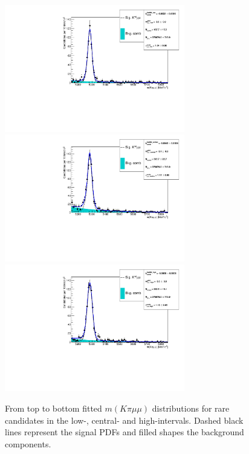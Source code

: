 %
\begin{figure}[h!]
\centering
\includegraphics[width=0.7\textwidth]{RKst/figs/Fit/fit_MM/KstMM_low.pdf}
\includegraphics[width=0.7\textwidth]{RKst/figs/Fit/fit_MM/KstMM_central.pdf}
\includegraphics[width=0.7\textwidth]{RKst/figs/Fit/fit_MM/KstMM_high.pdf}
\caption{From top to bottom fitted 
$m(K\pi \mu\mu)$ distributions for rare candidates in the low-, central- and high-\qsq intervals. 
Dashed black lines represent the signal PDFs and filled shapes the background components. }
\label{fig:mumu_data_fits}
\end{figure}

